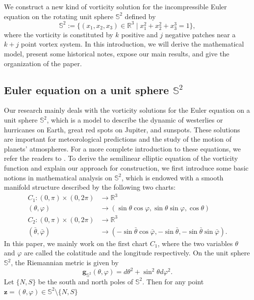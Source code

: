 \documentclass[12pt,reqno]{amsart}
\numberwithin{equation}{section}
\theoremstyle{definition}
\theoremstyle{remark}
\begin{document}
	We construct a new kind of vorticity solution for the incompressible Euler equation on the rotating unit sphere $\mathbb S^2$ defined by
	$$\mathbb S^2:=\{ (x_1,x_2,x_3)\in\mathbb R^3 \mid x_1^2+x_2^2+x_3^3=1\},$$
	where the vorticity is constituted by $k$ positive and $j$ negative patches near a $k+j$ point vortex system. In this introduction, 
	we will derive the mathematical model, present some historical notes, expose our main results, and give the organization of the paper.

	\subsection{Euler equation on a unit sphere $\mathbb S^2$}
	
	Our research mainly deals with the vorticity solutions for the Euler equation on a unit sphere $\mathbb S^2$, which is a model to 
	describe the dynamic of westerlies or hurricanes on Earth, great red spots on Jupiter, and sunspots. These solutions are important 
	for meteorological predictions and the study of the motion of planets' atmospheres. For a more complete introduction to these equations, 
	we refer the readers to \cite{Gre, Yuri}. To derive the semilinear elliptic equation of the vorticity function and explain our 
	approach for construction, we first introduce some basic notions in mathematical analysis on $\mathbb S^2$, which is endowed 
	with a smooth manifold structure described by the following two charts:
	\begin{align*}
	   C_1: (0,\pi)\times(0,2\pi)&\to \mathbb R^3\\
	   (\theta,\varphi)&\to (\sin\theta\cos\varphi, \sin\theta\sin\varphi,\cos\theta)\\
	   C_2: (0,\pi)\times(0,2\pi)&\to \mathbb R^3\\
	   (\bar\theta,\bar\varphi)&\to (-\sin\bar\theta\cos\bar\varphi, -\sin\bar\theta,-\sin\bar\theta\sin\bar\varphi).
	\end{align*}
	In this paper, we mainly work on the first chart $C_1$, where the two variables $\theta$ and $\varphi$ are called the colatitude 
	and the longitude respectively. On the unit sphere $\mathbb S^2$, the Riemannian metric is given by
	\begin{equation*}
		\mathbf g_{\mathbb S^2}(\theta,\varphi)=d\theta^2+\sin^2\theta d\varphi^2.
	\end{equation*}
	Let $ \{N, S\}$ be the south and north poles of $\mathbb S^2$. Then for any point $\boldsymbol z = (\theta, \varphi) \in \mathbb S^2 \setminus \{N, S\}$ 
\end{document}
